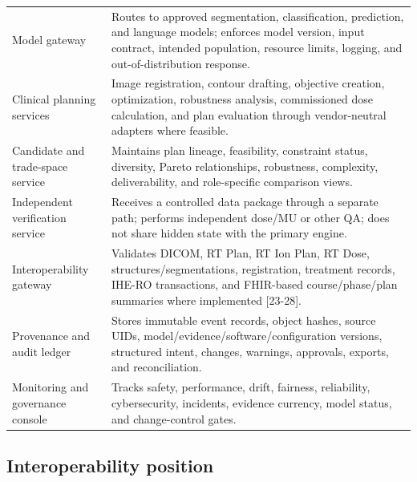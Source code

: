 \documentclass[11pt,letterpaper]{article}
\begin{document}
\begin{small}
\begin{longtable}{@{}L{0.2064\textwidth}L{0.7136\textwidth}@{}}
\addlinespace[2pt]
Model gateway & Routes to approved segmentation, classification, prediction, and language models; enforces model version, input contract, intended population, resource limits, logging, and out-of-distribution response. \\
\addlinespace[2pt]
Clinical planning services & Image registration, contour drafting, objective creation, optimization, robustness analysis, commissioned dose calculation, and plan evaluation through vendor-neutral adapters where feasible. \\
\addlinespace[2pt]
Candidate and trade-space service & Maintains plan lineage, feasibility, constraint status, diversity, Pareto relationships, robustness, complexity, deliverability, and role-specific comparison views. \\
\addlinespace[2pt]
Independent verification service & Receives a controlled data package through a separate path; performs independent dose\slash\allowbreak{}MU or other QA; does not share hidden state with the primary engine. \\
\addlinespace[2pt]
Interoperability gateway & Validates DICOM, RT Plan, RT Ion Plan, RT Dose, structures\slash\allowbreak{}segmentations, registration, treatment records, IHE-RO transactions, and FHIR-based course\slash\allowbreak{}phase\slash\allowbreak{}plan summaries where implemented [23-28]. \\
\addlinespace[2pt]
Provenance and audit ledger & Stores immutable event records, object hashes, source UIDs, model\slash\allowbreak{}evidence\slash\allowbreak{}software\slash\allowbreak{}configuration versions, structured intent, changes, warnings, approvals, exports, and reconciliation. \\
\addlinespace[2pt]
Monitoring and governance console & Tracks safety, performance, drift, fairness, reliability, cybersecurity, incidents, evidence currency, model status, and change-control gates. \\
\end{longtable}
\end{small}

\subsection{Interoperability position}
\end{document}
